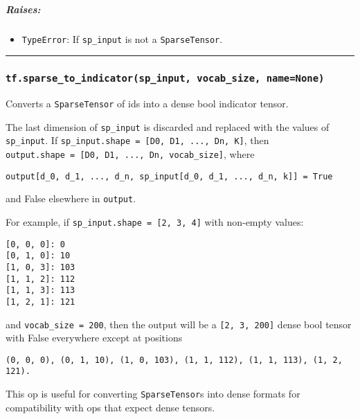 \subparagraph{Raises: }\label{raises}

\begin{itemize}
\tightlist
\item
  \texttt{TypeError}: If \texttt{sp\_input} is not a
  \texttt{SparseTensor}.
\end{itemize}

\begin{center}\rule{0.5\linewidth}{\linethickness}\end{center}

\subsubsection{\texorpdfstring{\texttt{tf.sparse\_to\_indicator(sp\_input,\ vocab\_size,\ name=None)}
}{tf.sparse\_to\_indicator(sp\_input, vocab\_size, name=None) }}\label{tf.sparseux5ftoux5findicatorspux5finput-vocabux5fsize-namenone}

Converts a \texttt{SparseTensor} of ids into a dense bool indicator
tensor.

The last dimension of \texttt{sp\_input} is discarded and replaced with
the values of \texttt{sp\_input}. If
\texttt{sp\_input.shape\ =\ {[}D0,\ D1,\ ...,\ Dn,\ K{]}}, then
\texttt{output.shape\ =\ {[}D0,\ D1,\ ...,\ Dn,\ vocab\_size{]}}, where

\begin{verbatim}
output[d_0, d_1, ..., d_n, sp_input[d_0, d_1, ..., d_n, k]] = True
\end{verbatim}

and False elsewhere in \texttt{output}.

For example, if \texttt{sp\_input.shape\ =\ {[}2,\ 3,\ 4{]}} with
non-empty values:

\begin{verbatim}
[0, 0, 0]: 0
[0, 1, 0]: 10
[1, 0, 3]: 103
[1, 1, 2]: 112
[1, 1, 3]: 113
[1, 2, 1]: 121
\end{verbatim}

and \texttt{vocab\_size\ =\ 200}, then the output will be a
\texttt{{[}2,\ 3,\ 200{]}} dense bool tensor with False everywhere
except at positions

\begin{verbatim}
(0, 0, 0), (0, 1, 10), (1, 0, 103), (1, 1, 112), (1, 1, 113), (1, 2, 121).
\end{verbatim}

This op is useful for converting \texttt{SparseTensor}s into dense
formats for compatibility with ops that expect dense tensors.


